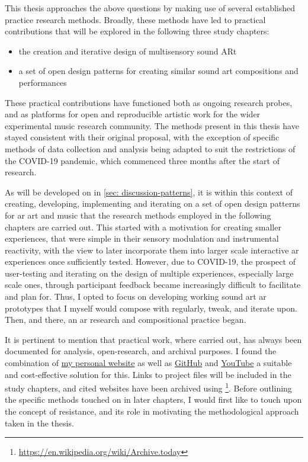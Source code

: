 This thesis approaches the above questions by making use of several established practice research methods. Broadly, these methods have led to practical contributions that will be explored in the following three study chapters: 
\begin{itemize}
    \item the creation and iterative design of multisensory sound ARt
    \item a set of open design patterns for creating similar sound \gls{art} compositions and performances
\end{itemize}
These practical contributions have functioned both as ongoing research probes, and as platforms for open and reproducible artistic work for the wider experimental music research community. The methods present in this thesis have stayed consistent with their original proposal, with the exception of specific methods of data collection and analysis being adapted to suit the restrictions of the COVID-19 pandemic, which commenced three months after the start of research. 

As will be developed on in \autoref{sec: discussion-patterns}, it is within this context of creating, developing, implementing and iterating on a set of open design patterns for \gls{ar} art and music that the research methods employed in the following chapters are carried out. This started with a motivation for creating smaller experiences, that were simple in their sensory modulation and instrumental reactivity, with the view to later incorporate them into larger scale interactive \gls{ar} experiences once sufficiently tested. However, due to COVID-19, the prospect of user-testing and iterating on the design of multiple experiences, especially large scale ones, through participant feedback became increasingly difficult to facilitate and plan for. Thus, I opted to focus on developing working sound art \gls{ar} prototypes that I myself would compose with regularly, tweak, and iterate upon. Then, and there, an \gls{ar} research and compositional practice began.

It is pertinent to mention that practical work, where carried out, has always been documented for analysis, open-research, and archival purposes. I found the combination of \href{https://sambilbow.github.io}{my personal website} as well as \href{https://github.com/sambilbow}{GitHub} and \href{https://youtube.com/@sambilbow}{YouTube} a suitable and cost-effective solution for this. Links to project files will be included in the study chapters, and cited websites have been archived using  \footnote{\url{https://en.wikipedia.org/wiki/Archive.today}}. Before outlining the specific methods touched on in later chapters, I would first like to touch upon the concept of resistance, and its role in motivating the methodological approach taken in the thesis.



